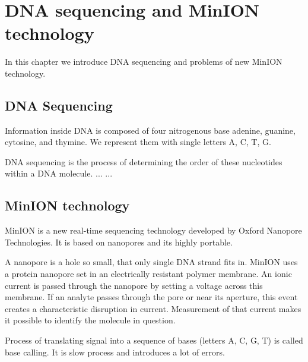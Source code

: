 \chapter[DNA sequencing]{DNA sequencing and MinION technology}
\label{kap:bio}

In this chapter we introduce DNA sequencing and problems of new MinION technology.

\section{DNA Sequencing}

Information inside DNA is composed of four nitrogenous base adenine, guanine, cytosine, and thymine. We represent them with single letters A, C, T, G.

DNA sequencing is the process of determining the order of these nucleotides within a DNA molecule. 
...
... 


\section{MinION technology}

MinION is a new real-time sequencing technology developed by Oxford Nanopore
Technologies. It is based on nanopores and its highly portable. 

A nanopore is a hole so small, that only single DNA strand fits in. MinION
uses a protein nanopore set in an electrically resistant polymer membrane. An ionic current is passed through the nanopore by setting a voltage across this membrane. If an analyte passes through the pore or near its aperture, this event creates a characteristic disruption in current. Measurement of that current makes it possible to identify the molecule in question.



Process of translating signal into a sequence of bases (letters A, C, G, T) is called base calling. It is slow process and introduces a lot of errors.